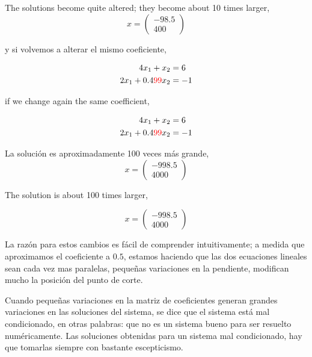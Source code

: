 \begin{paracol}{2}
\switchcolumn

The solutions become quite altered; they become about 10 times larger,
\begin{equation*}
x=\begin{pmatrix}
-98.5\\
400
\end{pmatrix}
\end{equation*}

\switchcolumn
y si volvemos a alterar el mismo coeficiente,

\begin{align*}
4x_1+x_2&=6\\
2x_1+0.4{\color{red}99} x_2&=-1
\end{align*}

\switchcolumn

if we change again the same coefficient,

\begin{align*}
4x_1+x_2&=6\\
2x_1+0.4{\color{red}99} x_2&=-1
\end{align*}

\switchcolumn

La solución es aproximadamente 100 veces más grande,
\begin{equation*}
x=\begin{pmatrix}
-998.5\\
4000
\end{pmatrix}
\end{equation*}

\switchcolumn

The solution is about 100 times larger,

\begin{equation*}
x=\begin{pmatrix}
-998.5\\
4000
\end{pmatrix}
\end{equation*}

\switchcolumn
La razón para estos cambios es fácil de comprender intuitivamente; a medida que aproximamos el coeficiente a $0.5$, estamos haciendo que las dos ecuaciones lineales sean cada vez mas paralelas, pequeñas variaciones en la pendiente, modifican mucho la posición del punto de corte.

Cuando pequeñas variaciones en la matriz de coeficientes generan grandes variaciones en las soluciones del sistema, se dice que el sistema está mal condicionado, en otras palabras: que no es un sistema bueno para ser resuelto numéricamente. Las soluciones obtenidas para un sistema mal condicionado, hay que tomarlas siempre con bastante escepticismo.


\end{paracol}
